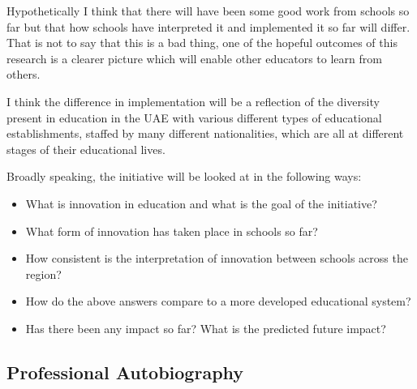 Hypothetically I think that there will have been some good work from schools so far but that how schools have interpreted it and implemented it so far will differ. That is not to say that this is a bad thing, one of the hopeful outcomes of this research is a clearer picture which will enable other educators to learn from others.

I think the difference in implementation will be a reflection of the diversity present in education in the UAE with various different types of educational establishments, staffed by many different nationalities, which are all at different stages of their educational lives.

Broadly speaking, the initiative will be looked at in the following ways: 

\begin{itemize}
\item What is innovation in education and what is the goal of the initiative?
\item What form of innovation has taken place in schools so far?
\item How consistent is the interpretation of innovation between schools across the region?
\item How do the above answers compare to a more developed educational system?
\item Has there been any impact so far? What is the predicted future impact?

\end{itemize}

\subsection{Professional Autobiography}

